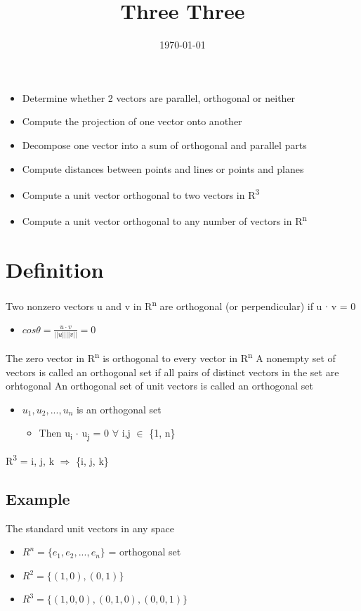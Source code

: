 \documentclass[11pt]{article}
\date{\today}
\title{Three Three}
\begin{document}
\maketitle
\tableofcontents

\begin{itemize}
\item Determine whether 2 vectors are parallel, orthogonal or neither
\item Compute the projection of one vector onto another
\item Decompose one vector into a sum of orthogonal and parallel parts
\item Compute distances between points and lines or points and planes
\item Compute a unit vector orthogonal to two vectors in R\textsuperscript{3}
\item Compute a unit vector orthogonal to any number of vectors in R\textsuperscript{n}
\end{itemize}
\section{Definition}
\label{sec:orgc4aa64f}
Two nonzero vectors u and v in R\textsuperscript{n} are orthogonal (or perpendicular) if u \(\cdot\) v = 0
\begin{itemize}
\item \(cos\theta{} = \frac{u \cdot{} v}{||u||| |v||} = 0\)
\end{itemize}
The zero vector in R\textsuperscript{n} is orthogonal to every vector in R\textsuperscript{n}
A nonempty set of vectors is called an orthogonal set if all pairs of distinct vectors in the set are orhtogonal
An orthogonal set of unit vectors is called an orthogonal set
\begin{itemize}
\item \({u_{1}, u_{2}, ..., u_{n}}\) is an orthogonal set
\begin{itemize}
\item Then u\textsubscript{i} \(\cdot\) u\textsubscript{j} = 0 \(\forall\) i,j \(\in\) \{1, n\}
\end{itemize}
\end{itemize}
R\textsuperscript{3} = i, j, k \(\Rightarrow\) \{i, j, k\}
\subsection{Example}
\label{sec:org8e562e0}
The standard unit vectors in any space
\begin{itemize}
\item \(R^{n} = \{e_{1}, e_{2}, ..., e_{n}\}\) = orthogonal set
\item \(R^{2} = \{(1,0), (0,1)\}\)
\item \(R^{3} = \{(1,0,0), (0,1,0), (0,0,1)\}\)
\end{itemize}
\end{document}
